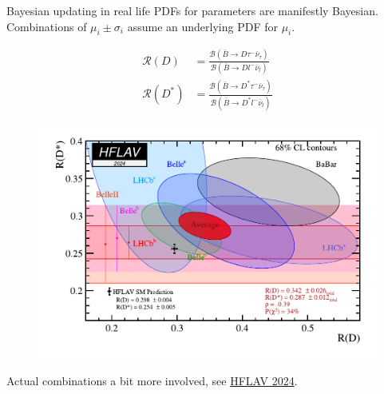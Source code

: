 \documentclass[
aspectratio=169,
14pt,
professionalfonts
]{beamer}
\begin{document}
\begin{frame}{Bayesian updating in real life}
        \vspace{-0.5cm}
        PDFs for parameters are manifestly Bayesian.\\
        Combinations of $\mu_i \pm \sigma_i$ assume an underlying PDF for $\mu_i$.
        \begin{minipage}{0.44\textwidth}
            \begin{align*}
                \mathcal{R}(D) &= \frac{
                    \mathcal{B}(\bar B \to D \tau^- \bar{\nu}_\tau)
                }{
                    \mathcal{B}(\bar B \to D l^- \bar{\nu}_l)
                }\\
                \mathcal{R}(D^*) &= \frac{
                    \mathcal{B}(\bar B \to D^* \tau^- \bar{\nu}_\tau)
                }{
                    \mathcal{B}(\bar B \to D^* l^- \bar{\nu}_l)
                }
            \end{align*}
        \end{minipage}
        \begin{minipage}{0.55\textwidth}
            \begin{figure}
                \centering
                \includegraphics[width=\textwidth]{../plots/rd_rdstar.pdf}
            \end{figure}
        \end{minipage}
        \small Actual combinations a bit more involved, see \href{https://arxiv.org/pdf/2411.18639}{HFLAV 2024}.
\end{frame}
\end{document}
